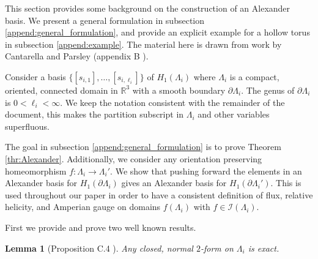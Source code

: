 \documentclass[11pt]{article}
\theoremstyle{plain}
\newtheorem{lemma}[theorem]{Lemma}
\theoremstyle{definition}
\theoremstyle{remark}
\newcommand{\R}{\mathbb{R}}
\newcommand{\ST}{\Lambda}
\begin{document}
This section provides some background on the construction of an Alexander basis. We present a general formulation in subsection \ref{append:general_formulation}, and provide  an explicit example for a hollow torus in subsection \ref{append:example}. The material here is drawn from work by Cantarella and Parsley (appendix B \cite{CANTARELLA20101127}).





Consider a basis \(\{[s_{i,1}], \dots, [s_{i,{\ell_i}}]\}\) of \(H_1 (\ST_i) \) where \(\ST_i\) is a compact, oriented, connected domain in \(\R^3\) with a smooth boundary \(\partial \ST_i\). The genus of \(\partial \ST_i\) is \(0 <{\ell_i} < \infty\). We keep the notation consistent with the remainder of the document, this makes the partition subscript in \(\ST_i\) and other variables superfluous. 



The goal in subsection \ref{append:general_formulation} is to prove Theorem \ref{thr:Alexander}. Additionally, we consider any orientation preserving homeomorphism \(f : \ST_i \to \ST_i'\). We show that pushing forward the elements in an Alexander basis for \(H_1(\partial \ST_i)\) gives an Alexander basis for \(H_1(\partial \ST_i')\). This is used throughout our paper in order to have a consistent definition of flux, relative helicity, and Amperian gauge on domains \(f(\ST_i)\) with \(f \in \mathcal{I}( \ST_i )\).


First we provide and prove two well known results.
\begin{lemma}[Proposition C.4 \cite{CANTARELLA20101127}]\label{Lemma:Potential}
    Any closed, normal \(2\)-form on \(\ST_i\) is exact.
\end{lemma}
\end{document}
